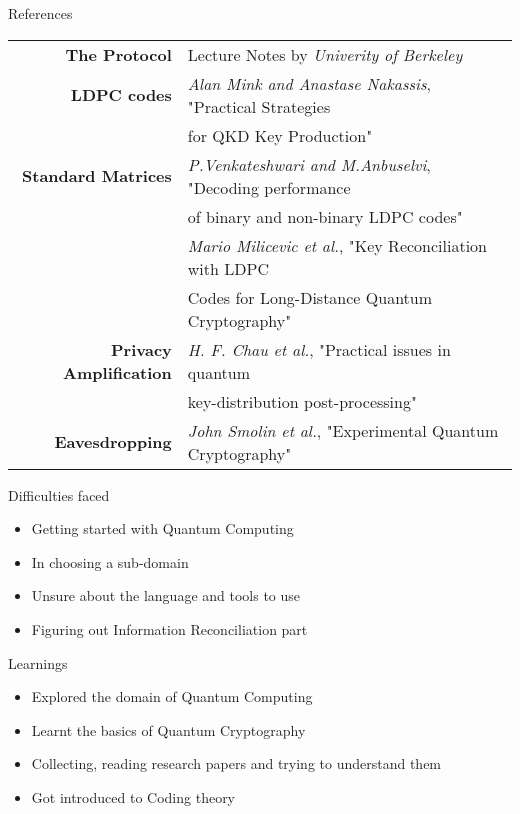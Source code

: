 \documentclass{beamer}
\begin{document}
\begin{frame}{References}
    \begin{tabular}{r l}
        \footnotesize{\textbf{The Protocol}} & \footnotesize{Lecture Notes by \emph{Univerity of Berkeley}} \\
            \footnotesize{\textbf{LDPC codes}} & \footnotesize{\emph{Alan Mink and Anastase Nakassis}}, \footnotesize{"Practical Strategies} \\
             & \footnotesize{for QKD Key Production"} \\
            \footnotesize{\textbf{Standard Matrices}} & \footnotesize{\emph{P.Venkateshwari and M.Anbuselvi}, "Decoding performance} \\ 
             & \footnotesize{of binary and non-binary LDPC codes"} \\
             & \footnotesize{\emph{Mario Milicevic et al.}, "Key Reconciliation with LDPC} \\ 
              & \footnotesize{Codes for Long-Distance Quantum Cryptography"} \\
            \footnotesize{\textbf{Privacy Amplification}} & \footnotesize{\emph{H. F. Chau et al.}, "Practical issues in quantum} \\ 
              & \footnotesize{key-distribution post-processing"} \\
            \footnotesize{\textbf{Eavesdropping}} & \footnotesize{\emph{John Smolin et al.}, "Experimental Quantum Cryptography"} \\
    \end{tabular}
\end{frame}
    

\begin{frame}{Difficulties faced}
	\begin{itemize}
		\item Getting started with Quantum Computing
        \item In choosing a sub-domain
        \item Unsure about the language and tools to use
		\item Figuring out Information Reconciliation part
	\end{itemize}
\end{frame}


\begin{frame}{Learnings}
	\begin{itemize}
		\item Explored the domain of Quantum Computing
		\item Learnt the basics of Quantum Cryptography
		\item Collecting, reading research papers and trying to understand them
		\item Got introduced to Coding theory
	\end{itemize}
\end{frame}
\end{document}
